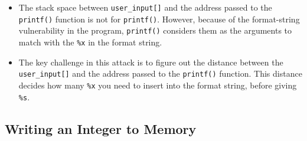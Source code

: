 \begin{itemize}
   \item The stack space between {\tt user\_input[]} and the address passed to
         the {\tt printf()} function is not for {\tt printf()}. However, because
         of the format-string vulnerability in the program, {\tt printf()}
         considers them as the arguments to match with the \verb|%x| in
         the format string.

   \item The key challenge in this attack is to figure out the distance between the
         {\tt user\_input[]} and the address passed to the {\tt printf()} function.
         This distance decides how many \verb|%x| you need to insert into the
         format string, before giving \verb|%s|.


   \end{itemize}




\subsection{Writing an Integer to Memory}

